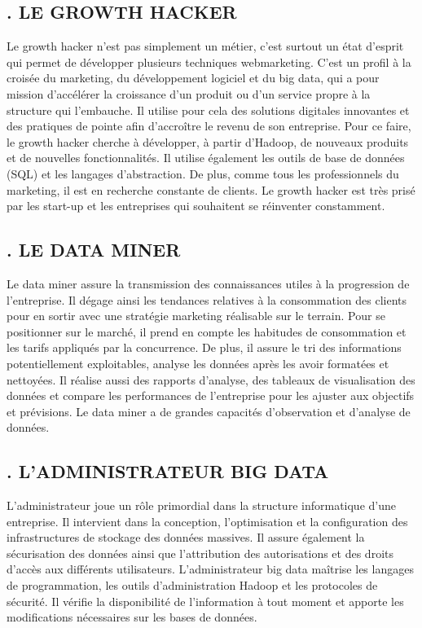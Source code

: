 \subsection*{. LE GROWTH HACKER}
Le growth hacker n'est pas simplement un métier, c'est surtout un état d'esprit qui permet de développer plusieurs techniques webmarketing. C'est un profil à la croisée du marketing, du développement logiciel et du big data, qui a pour mission d'accélérer la croissance d'un produit ou d'un service propre à la structure qui l'embauche. Il utilise pour cela des solutions digitales innovantes et des pratiques de pointe afin d'accroître le revenu de son entreprise. Pour ce faire, le growth hacker cherche à développer, à partir d'Hadoop, de nouveaux produits et de nouvelles fonctionnalités. Il utilise également les outils de base de données (SQL) et les langages d'abstraction. De plus, comme tous les professionnels du marketing, il est en recherche constante de clients. Le growth hacker est très prisé par les start-up et les entreprises qui souhaitent se réinventer constamment. 

\subsection*{. LE DATA MINER}
Le data miner assure la transmission des connaissances utiles à la progression de l'entreprise. Il dégage ainsi les tendances relatives à la consommation des clients pour en sortir avec une stratégie marketing réalisable sur le terrain. Pour se positionner sur le marché, il prend en compte les habitudes de consommation et les tarifs appliqués par la concurrence. De plus, il assure le tri des informations potentiellement exploitables, analyse les données après les avoir formatées et nettoyées. Il réalise aussi des rapports d'analyse, des tableaux de visualisation des données et compare les performances de l'entreprise pour les ajuster aux objectifs et prévisions. Le data miner a de grandes capacités d'observation et d'analyse de données.

\subsection*{. L'ADMINISTRATEUR BIG DATA}
L'administrateur joue un rôle primordial dans la structure informatique d'une entreprise. Il intervient dans la conception, l'optimisation et la configuration des infrastructures de stockage des données massives. Il assure également la sécurisation des données ainsi que l'attribution des autorisations et des droits d'accès aux différents utilisateurs. L'administrateur big data maîtrise les langages de programmation, les outils d'administration Hadoop et les protocoles de sécurité. Il vérifie la disponibilité de l'information à tout moment et apporte les modifications nécessaires sur les bases de données.